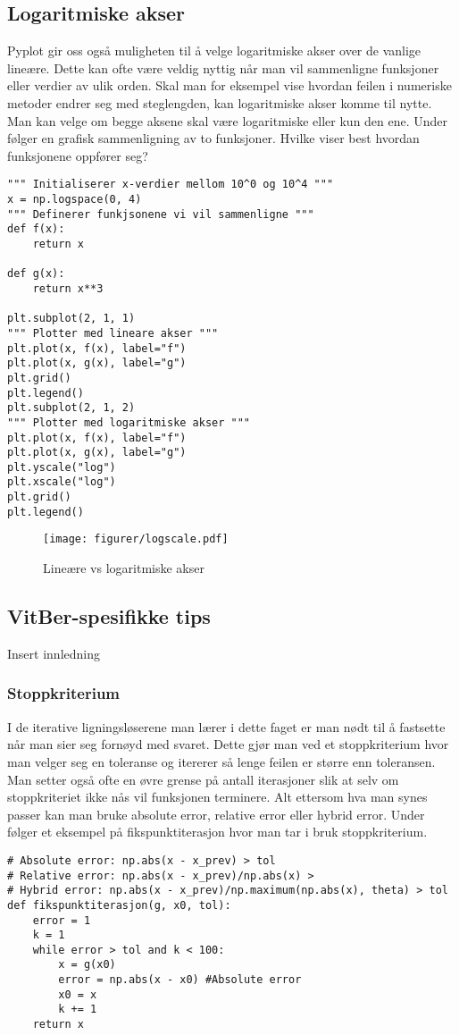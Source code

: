 \documentclass[a4paper,12pt]{article}
\begin{document}
\subsection{Logaritmiske akser}
Pyplot gir oss også muligheten til å velge logaritmiske akser over de vanlige lineære. Dette kan ofte være veldig nyttig når man vil sammenligne funksjoner eller verdier av ulik orden. Skal man for eksempel vise hvordan feilen i numeriske metoder endrer seg med steglengden, kan logaritmiske akser komme til nytte. Man kan velge om begge aksene skal være logaritmiske eller kun den ene. Under følger en grafisk sammenligning av to funksjoner. Hvilke viser best hvordan funksjonene oppfører seg?

\begin{lstlisting}
""" Initialiserer x-verdier mellom 10^0 og 10^4 """
x = np.logspace(0, 4) 
""" Definerer funkjsonene vi vil sammenligne """
def f(x):
    return x 

def g(x):
    return x**3

plt.subplot(2, 1, 1)
""" Plotter med lineare akser """
plt.plot(x, f(x), label="f")
plt.plot(x, g(x), label="g")
plt.grid()
plt.legend()
plt.subplot(2, 1, 2)
""" Plotter med logaritmiske akser """
plt.plot(x, f(x), label="f")
plt.plot(x, g(x), label="g")
plt.yscale("log")
plt.xscale("log")
plt.grid()
plt.legend()
\end{lstlisting}

\begin{figure}[ht]
    \centering
    \texttt{[image: figurer/logscale.pdf]}
    \caption{Lineære vs logaritmiske akser}
    \label{fig:logscale.pdf}
\end{figure}


\subsection{VitBer-spesifikke tips}
Insert innledning

\subsubsection{Stoppkriterium}
I de iterative ligningsløserene man lærer i dette faget er man nødt til å fastsette når man sier seg fornøyd med svaret. Dette gjør man ved et stoppkriterium hvor man velger seg en toleranse og itererer så lenge feilen er større enn toleransen. Man setter også ofte en øvre grense på antall iterasjoner slik at selv om stoppkriteriet ikke nås vil funksjonen terminere. Alt ettersom hva man synes passer kan man bruke absolute error, relative error eller hybrid error. Under følger et eksempel på fikspunktiterasjon hvor man tar i bruk stoppkriterium.

\begin{lstlisting}
# Absolute error: np.abs(x - x_prev) > tol
# Relative error: np.abs(x - x_prev)/np.abs(x) > 
# Hybrid error: np.abs(x - x_prev)/np.maximum(np.abs(x), theta) > tol
def fikspunktiterasjon(g, x0, tol):
    error = 1
    k = 1
    while error > tol and k < 100:
        x = g(x0)
        error = np.abs(x - x0) #Absolute error
        x0 = x
        k += 1
    return x
\end{lstlisting}
\end{document}
